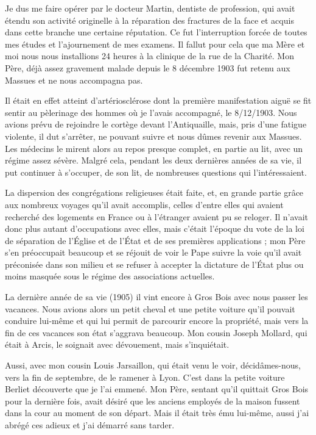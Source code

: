 \documentclass[11pt,a4paper]{report}
\begin{document}
Je dus me faire opérer par le docteur Martin, dentiste de profession, qui avait étendu son activité originelle à la réparation des fractures de la face et acquis dans cette branche une certaine réputation. Ce fut l'interruption forcée de toutes mes études et l'ajournement de mes examens. Il fallut pour cela que ma Mère et moi nous nous installions 24 heures à la clinique de la rue de la Charité. Mon Père, déjà assez gravement malade depuis le 8 décembre 1903 fut retenu aux Massues et ne nous accompagna pas.

Il était en effet atteint d'artériosclérose dont la première manifestation aiguë se fit sentir au pèlerinage des hommes où je l'avais accompagné, le 8/12/1903. Nous avions prévu de rejoindre le cortège devant l'Antiquaille, mais, pris d'une fatigue violente, il dut s'arrêter, ne pouvant suivre et nous dûmes revenir aux Massues. Les médecins le mirent alors au repos presque complet, en partie au lit, avec un régime assez sévère. Malgré cela, pendant les deux dernières années de sa vie, il put continuer à s'occuper, de son lit, de nombreuses questions qui l'intéressaient.

La dispersion des congrégations religieuses était faite, et, en grande partie grâce aux nombreux voyages qu'il avait accomplis, celles d'entre elles qui avaient recherché des logements en France ou à l'étranger avaient pu se reloger. Il n'avait donc plus autant d'occupations avec elles, mais c'était l'époque du vote de la loi de séparation de l'Église et de l'État et de ses premières applications ; mon Père s'en préoccupait beaucoup et se réjouit de voir le Pape suivre la voie qu'il avait préconisée dans son milieu et se refuser à accepter la dictature de l'État plus ou moins masquée sous le régime des associations actuelles.

La dernière année de sa vie (1905) il vint encore à Gros Bois avec nous passer les vacances. Nous avions alors un petit cheval et une petite voiture qu'il pouvait conduire lui-même et qui lui permit de parcourir encore la propriété, mais vers la fin de ces vacances son état s'aggrava beaucoup. Mon cousin Joseph Mollard, qui était à Arcis, le soignait avec dévouement, mais s'inquiétait.


Aussi, avec mon cousin Louis Jarsaillon, qui était venu le voir, décidâmes-nous, vers la fin de septembre, de le ramener à Lyon. C'est dans la petite voiture Berliet découverte que je l'ai emmené. Mon Père, sentant qu'il quittait Gros Bois pour la dernière fois, avait désiré que les anciens employés de la maison fussent dans la cour au moment de son départ. Mais il était très ému lui-même, aussi j'ai abrégé ces adieux et j'ai démarré sans tarder.
\end{document}

